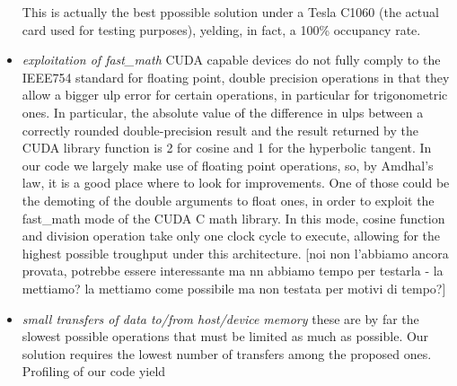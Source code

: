 \begin{itemize}
This is actually the best ppossible solution under a Tesla C1060 (the actual card used for testing purposes), yelding, in fact, a 100\% occupancy rate.
\item \textsl{exploitation of fast\_math} CUDA capable devices do not fully comply to the IEEE754 standard for floating point, double precision operations in that they allow a bigger ulp error for certain operations, in particular for trigonometric ones. In particular, the absolute value of the difference in ulps between a correctly rounded double-precision result and the result returned by the CUDA library function is 2 for cosine and 1 for the hyperbolic tangent. In our code we largely make use of floating point operations, so, by Amdhal's law, it is a good place where to look for improvements. One of those could be the demoting of the double arguments to float ones, in order to exploit the fast\_math mode of the CUDA C math library. In this mode, cosine function and division operation take only one clock cycle to execute, allowing for the highest possible troughput under this architecture. [noi non l'abbiamo ancora provata, potrebbe essere interessante ma nn abbiamo tempo per testarla - la mettiamo? la mettiamo come possibile ma non testata per motivi di tempo?]
\item \textsl{small transfers of data to/from host/device memory} these are by far the slowest possible operations that must be limited as much as possible. Our solution requires the lowest number of transfers among the proposed ones. Profiling of our code yield
\end{itemize}
